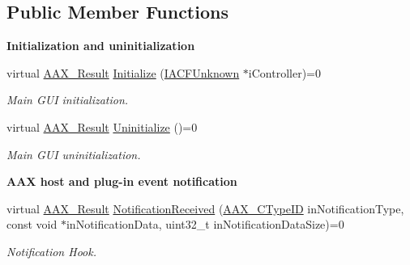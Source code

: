 \subsection*{Public Member Functions}
\begin{Indent}{\bf Initialization and uninitialization}\par
\begin{DoxyCompactItemize}
\item 
virtual \hyperlink{a00149_a4d8f69a697df7f70c3a8e9b8ee130d2f}{A\+A\+X\+\_\+\+Result} \hyperlink{a00060_aac9d8ab88172ac594d86ac2441522fec}{Initialize} (\hyperlink{a00146}{I\+A\+C\+F\+Unknown} $\ast$i\+Controller)=0
\begin{DoxyCompactList}\small\item\em Main G\+U\+I initialization. \end{DoxyCompactList}\item 
virtual \hyperlink{a00149_a4d8f69a697df7f70c3a8e9b8ee130d2f}{A\+A\+X\+\_\+\+Result} \hyperlink{a00060_ab7d1c3c80a60637f9a9fd1860fe418cb}{Uninitialize} ()=0
\begin{DoxyCompactList}\small\item\em Main G\+U\+I uninitialization. \end{DoxyCompactList}\end{DoxyCompactItemize}
\end{Indent}
\begin{Indent}{\bf A\+A\+X host and plug-\/in event notification}\par
\begin{DoxyCompactItemize}
\item 
virtual \hyperlink{a00149_a4d8f69a697df7f70c3a8e9b8ee130d2f}{A\+A\+X\+\_\+\+Result} \hyperlink{a00060_a11a15162cb3c7019d1fabf2994fba6c6}{Notification\+Received} (\hyperlink{a00149_ac678f9c1fbcc26315d209f71a147a175}{A\+A\+X\+\_\+\+C\+Type\+I\+D} in\+Notification\+Type, const void $\ast$in\+Notification\+Data, uint32\+\_\+t in\+Notification\+Data\+Size)=0
\begin{DoxyCompactList}\small\item\em Notification Hook. \end{DoxyCompactList}\end{DoxyCompactItemize}
\end{Indent}
